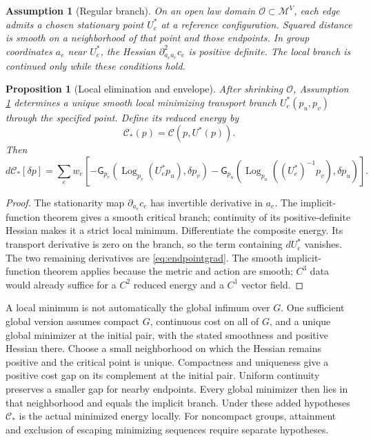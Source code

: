 \documentclass[11pt]{article}
\newtheorem{proposition}[theorem]{Proposition}
\newtheorem{assumption}[theorem]{Assumption}
\DeclareMathOperator{\Log}{Log}
\newcommand{\M}{\mathcal M}
\newcommand{\G}{\mathsf G}
\begin{document}
\begin{assumption}[Regular branch]
On an open law domain $\mathcal O\subset\M^V$, each edge admits a chosen stationary point $U_e^*$ at a reference configuration. Squared distance is smooth on a neighborhood of that point and those endpoints. In group coordinates $a_e$ near $U_e^*$, the Hessian $\partial^2_{a_ea_e}c_e$ is positive definite. The local branch is continued only while these conditions hold.
\label{ass:branch}
\end{assumption}

\begin{proposition}[Local elimination and envelope]
After shrinking $\mathcal O$, Assumption \ref{ass:branch} determines a unique smooth local minimizing transport branch $U_e^*(p_u,p_v)$ through the specified point. Define its reduced energy by
\begin{equation}
 \mathcal C_*(p)=\mathcal C(p,U^*(p)).
\end{equation}
Then
\begin{equation}
 d\mathcal C_*[\delta p]
 =\sum_e w_e\left[
  -\G_{p_v}(\Log_{p_v}(U_e^*p_u),\delta p_v)
  -\G_{p_u}(\Log_{p_u}((U_e^*)^{-1}p_v),\delta p_u)
 \right].
 \label{eq:envelope}
\end{equation}
\end{proposition}
\begin{proof}
The stationarity map $\partial_{a_e}c_e$ has invertible derivative in $a_e$. The implicit-function theorem gives a smooth critical branch; continuity of its positive-definite Hessian makes it a strict local minimum. Differentiate the composite energy. Its transport derivative is zero on the branch, so the term containing $dU_e^*$ vanishes. The two remaining derivatives are \eqref{eq:endpointgrad}. The smooth implicit-function theorem applies because the metric and action are smooth; $C^3$ data would already suffice for a $C^2$ reduced energy and a $C^1$ vector field.
\end{proof}

A local minimum is not automatically the global infimum over $G$. One sufficient global version assumes compact $G$, continuous cost on all of $G$, and a unique global minimizer at the initial pair, with the stated smoothness and positive Hessian there. Choose a small neighborhood on which the Hessian remains positive and the critical point is unique. Compactness and uniqueness give a positive cost gap on its complement at the initial pair. Uniform continuity preserves a smaller gap for nearby endpoints. Every global minimizer then lies in that neighborhood and equals the implicit branch. Under these added hypotheses $\mathcal C_*$ is the actual minimized energy locally. For noncompact groups, attainment and exclusion of escaping minimizing sequences require separate hypotheses.
\end{document}
